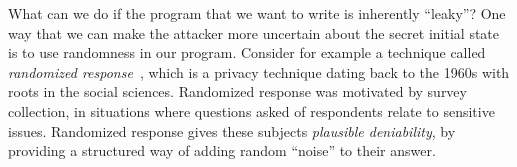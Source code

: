 \documentclass[11pt,twoside]{scrartcl}
\begin{document}

What can we do if the program that we want to write is inherently ``leaky''? One way that we can make the attacker more uncertain about the secret initial state is to use randomness in our program. Consider for example a technique called \emph{randomized response}~\cite{Warner1965}, which is a privacy technique dating back to the 1960s with roots in the social sciences. Randomized response was motivated by survey collection, in situations where questions asked of respondents relate to sensitive issues. Randomized response gives these subjects \emph{plausible deniability}, by providing a structured way of adding random ``noise'' to their answer.
\end{document}
